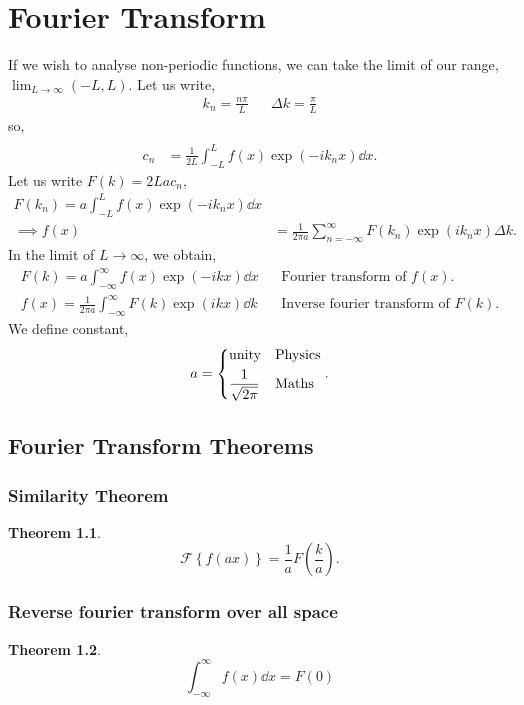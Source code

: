 \documentclass{book}
\newtheorem*{theorem}{Theorem}
\begin{document}
\chapter{Fourier Transform}
If we wish to analyse non-periodic functions, we can take the limit of our range, $\lim_{L\to\infty}(-L,L)$. Let us write,
\begin{align}
	k_n = \frac{n\pi}{L} && \Delta k = \frac{\pi}{L}
\end{align}
so,
\begin{align}
	 \\
	c_n & = \frac{1}{2L}\int_{-L}^{L}f(x)\exp\left(-ik_nx\right)\dd{x}.
\end{align}
Let us write $F(k) = 2Lac_n$,
\begin{align}
	F(k_n) = a\int_{-L}^{L}f(x)\exp\left(-ik_nx\right)\dd{x} \\
	\implies f(x) &= \frac{1}{2\pi a}\sum_{n = -\infty}^{\infty} F(k_n)\exp\left(i k_nx\right)\Delta k.
\end{align}
In the limit of $L \to \infty$, we obtain,
\begin{align}
	\boxed{F(k) = a\int_{-\infty}^{\infty}f(x)\exp(-ikx)\dd{x}} && \text{Fourier transform of $f(x)$.}\\
	\boxed{f(x) = \frac{1}{2\pi a}\int_{-\infty}^{\infty}F(k)\exp(ikx)\dd{k}} && \text{Inverse fourier transform of $F(k)$.}
\end{align}
We define constant,
\begin{equation}
	a = \begin{dcases}
		\text{unity} & \text{Physics} \\
		\frac{1}{\sqrt{2\pi}} & \text{Maths}
	\end{dcases}.
\end{equation}
\section{Fourier Transform Theorems}
\subsection{Similarity Theorem}
\begin{theorem}
	\begin{equation}
		\boxed{\mathscr{F}\left\{f(ax)\right\} = \frac{1}{a}F\left(\frac{k}{a}\right)}.
	\end{equation}
\end{theorem}
\subsection{Reverse fourier transform over all space}
\begin{theorem}
	\begin{equation}
		\boxed{\int_{-\infty}^{\infty}f(x)\dd{x} = F(0)}
	\end{equation}
\end{theorem}
\end{document}

